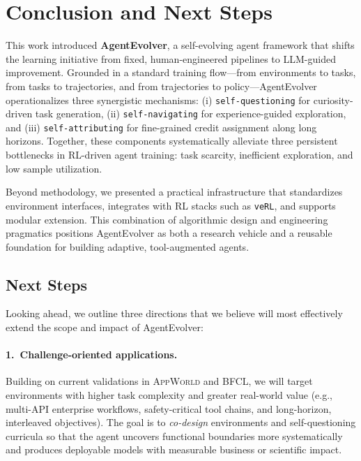 \section{Conclusion and Next Steps}
\label{sec:conclusion}
This work introduced \textbf{AgentEvolver}, a self-evolving agent framework that shifts the learning initiative from fixed, human-engineered pipelines to LLM-guided improvement. Grounded in a standard training flow---from environments to tasks, from tasks to trajectories, and from trajectories to policy---AgentEvolver operationalizes three synergistic mechanisms:
(i) \texttt{self-questioning} for curiosity-driven task generation,
(ii) \texttt{self-navigating} for experience-guided exploration, and
(iii) \texttt{self-attributing} for fine-grained credit assignment along long horizons.
Together, these components systematically alleviate three persistent bottlenecks in RL-driven agent training: task scarcity, inefficient exploration, and low sample utilization. 

Beyond methodology, we presented a practical infrastructure that standardizes environment interfaces, integrates with RL stacks such as \texttt{veRL}, and supports modular extension. This combination of algorithmic design and engineering pragmatics positions AgentEvolver as both a research vehicle and a reusable foundation for building adaptive, tool-augmented agents.

\subsection*{Next Steps}
Looking ahead, we outline three directions that we believe will most effectively extend the scope and impact of AgentEvolver:

\paragraph{1.\ Challenge-oriented applications.}
Building on current validations in \textsc{AppWorld} and \textsc{BFCL}, we will target environments with higher task complexity and greater real-world value (e.g., multi-API enterprise workflows, safety-critical tool chains, and long-horizon, interleaved objectives). The goal is to \emph{co-design} environments and self-questioning curricula so that the agent uncovers functional boundaries more systematically and produces deployable models with measurable business or scientific impact.


